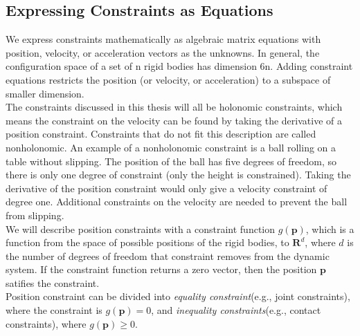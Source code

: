     \subsection{Expressing Constraints as Equations}
        We express constraints mathematically as algebraic matrix equations with position, velocity, or acceleration vectors as the unknowns. In general, the configuration space of a set of n rigid bodies has dimension 6n. Adding constraint equations restricts the position (or velocity, or acceleration) to a subspace of smaller dimension.\\

        The constraints discussed in this thesis will all be holonomic constraints, which means the constraint on the velocity can be found by taking the derivative of a position constraint. Constraints that do not fit this description are called nonholonomic. An example of a nonholonomic constraint is a ball rolling on a table without slipping. The position of the ball has five degrees of freedom, so there is only one degree of constraint (only the height is constrained). Taking the derivative of the position constraint would only give a velocity constraint of degree one. Additional constraints on the velocity are needed to prevent the ball from slipping.\\

        We will describe position constraints with a constraint function $g(\pmb{p})$, which is a function from the space of possible positions of the rigid bodies, to $\mathbf{R}^d$, where $d$ is the number of degrees of freedom that constraint removes from the dynamic system. If the constraint function returns a zero vector, then the position $\pmb{p}$ satifies the constraint. \\

        Position constraint can be divided into \textit{equality constraint}(e.g., joint constraints), where the constraint is $g(\pmb{p}) = 0$, and \textit{inequality constraints}(e.g., contact constraints), where $g(\pmb{p}) \ge 0$. \\

